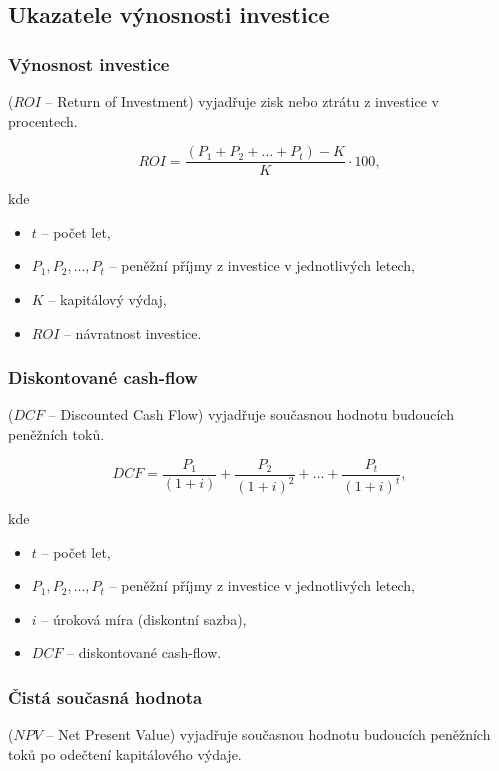 \subsection{Ukazatele výnosnosti investice}


\subsubsection{Výnosnost investice}
($ROI$ -- Return of Investment)
vyjadřuje zisk nebo ztrátu z investice v procentech.

\begin{equation}
    ROI = \frac{(P_1 + P_2 + \ldots + P_t) - K}{K} \cdot 100,
\end{equation}

kde
\begin{itemize}[label={}]
    \item $t$ -- počet let,
    \item $P_1, P_2, \ldots, P_t$ -- peněžní příjmy z investice v jednotlivých letech,
    \item $K$ -- kapitálový výdaj,
    \item $ROI$ -- návratnost investice.
\end{itemize}

\subsubsection{Diskontované cash-flow}
($DCF$ -- Discounted Cash Flow)
vyjadřuje současnou hodnotu budoucích peněžních toků.

\begin{equation}
    DCF = \frac{P_1}{(1+i)} + \frac{P_2}{(1+i)^2} + \ldots + \frac{P_t}{(1+i)^t},
\end{equation}

kde
\begin{itemize}[label={}]
    \item $t$ -- počet let,
    \item $P_1, P_2, \ldots, P_t$ -- peněžní příjmy z investice v jednotlivých letech,
    \item $i$ -- úroková míra (diskontní sazba),
    \item $DCF$ -- diskontované cash-flow.
\end{itemize}

\subsubsection*{Čistá současná hodnota}
($NPV$ -- Net Present Value)
vyjadřuje současnou hodnotu budoucích peněžních toků po odečtení kapitálového výdaje.

